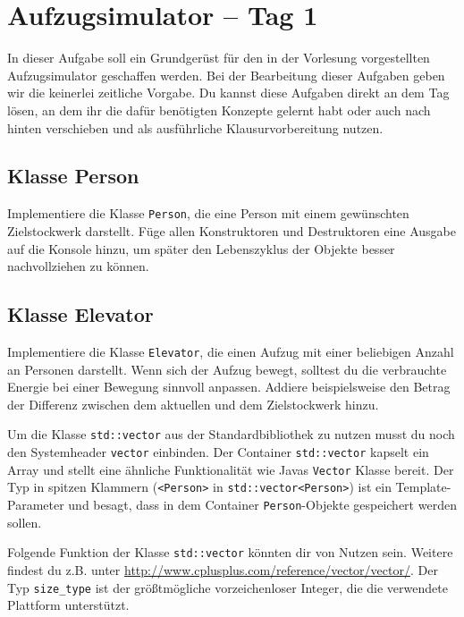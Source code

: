 \section{Aufzugsimulator -- Tag 1}
In dieser Aufgabe soll ein Grundgerüst für den in der Vorlesung vorgestellten Aufzugsimulator geschaffen werden.
Bei der Bearbeitung dieser Aufgaben geben wir die keinerlei zeitliche Vorgabe.
Du kannst diese Aufgaben direkt an dem Tag lösen, an dem ihr die dafür benötigten Konzepte gelernt habt oder auch nach hinten verschieben und als ausführliche Klausurvorbereitung nutzen.

\subsection{Klasse Person}
Implementiere die Klasse \lstinline{Person}, die eine Person mit einem gewünschten Zielstockwerk darstellt.
Füge allen Konstruktoren und Destruktoren eine Ausgabe auf die Konsole hinzu, um später den Lebenszyklus der Objekte besser nachvollziehen zu können.



\subsection{Klasse Elevator}
Implementiere die Klasse \lstinline{Elevator}, die einen Aufzug mit einer beliebigen Anzahl an Personen darstellt.
%
Wenn sich der Aufzug bewegt, solltest du die verbrauchte Energie bei einer Bewegung sinnvoll anpassen.
Addiere beispielsweise den Betrag der Differenz zwischen dem aktuellen und dem Zielstockwerk hinzu.



Um die Klasse \lstinline{std::vector} aus der Standardbibliothek zu nutzen musst du noch den Systemheader \lstinline{vector} einbinden.
Der Container \lstinline{std::vector} kapselt ein Array und stellt eine ähnliche Funktionalität wie Javas \lstinline{Vector} Klasse bereit.
Der Typ in spitzen Klammern (\lstinline{<Person>} in \lstinline{std::vector<Person>}) ist ein Template-Parameter und besagt, dass in dem Container \lstinline{Person}-Objekte gespeichert werden sollen.

Folgende Funktion der Klasse \lstinline{std::vector} könnten dir von Nutzen sein. Weitere findest du z.B. unter \url{http://www.cplusplus.com/reference/vector/vector/}. Der Typ \lstinline{size_type} ist der größtmögliche vorzeichenloser Integer, die die verwendete Plattform unterstützt.

